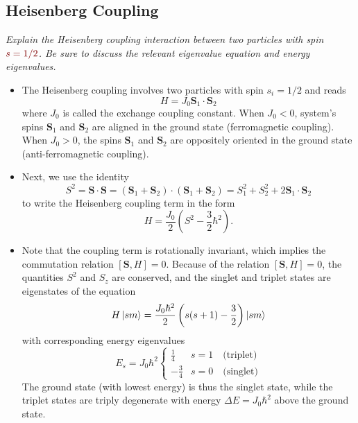 \documentclass[11pt, a4paper]{article}
\newcommand{\qmath}[1]{\textcolor{Maroon}{#1}}  %
\renewcommand{\vec}[1]{\bm{#1}}  %
\renewcommand{\S}{\vec{S}}  %
\begin{document}
\begin{itemize}
\end{itemize}

\subsection{Heisenberg Coupling}
\textit{Explain the Heisenberg coupling interaction between two particles with spin $ \qmath{s = 1/2} $. Be sure to discuss the relevant eigenvalue equation and energy eigenvalues.}

\begin{itemize}
    \item The Heisenberg coupling involves two particles with spin $ s_{i} = 1/2 $ and reads
    \begin{equation*}
        H = J_{0} \S_{1} \cdot \S_{2}
    \end{equation*}
    where $ J_{0} $ is called the exchange coupling constant. When $ J_{0} < 0 $, system's spins $ \S_{1} $ and $ \S_{2} $ are aligned in the ground state (ferromagnetic coupling). When $ J_{0} > 0 $, the spins $ \S_{1} $ and $ \S_{2} $ are oppositely oriented in the ground state (anti-ferromagnetic coupling). 

    \item Next, we use the identity
    \begin{equation*}
        S^{2} = \S \cdot \S = (\S_{1} + \S_{2}) \cdot (\S_{1} + \S_{2}) = S_{1}^{2} + S_{2}^{2} + 2 \S_{1} \cdot \S_{2}
    \end{equation*}
    to write the Heisenberg coupling term in the form
    \begin{equation*}
        H = \frac{J_{0}}{2}\left( S^{2} - \frac{3}{2} \hbar^{2} \right).
    \end{equation*}
    
    \item Note that the coupling term is rotationally invariant, which implies the commutation relation $ [\S, H] = 0 $. Because of the relation $ [\S, H] = 0 $, the quantities $ S^{2} $ and $ S_{z} $ are conserved, and the singlet and triplet states are eigenstates of the equation
    \begin{equation*}
        H \ket{sm} = \frac{J_{0}\hbar^{2}}{2} \left( s(s + 1) - \frac{3}{2} \right)\ket{sm}
    \end{equation*}
    with corresponding energy eigenvalues
    \begin{equation*}
        E_{s} = J_{0}\hbar^{2} 
        \begin{cases}
            \frac{1}{4} & s = 1 \quad \text{(triplet)}\\
            -\frac{3}{4} & s = 0 \quad \text{(singlet)}
        \end{cases}
    \end{equation*}
    The ground state (with lowest energy) is thus the singlet state, while the triplet states are triply degenerate with energy $ \Delta E = J_{0}\hbar^{2} $ above the ground state.

\end{itemize}
\end{document}
